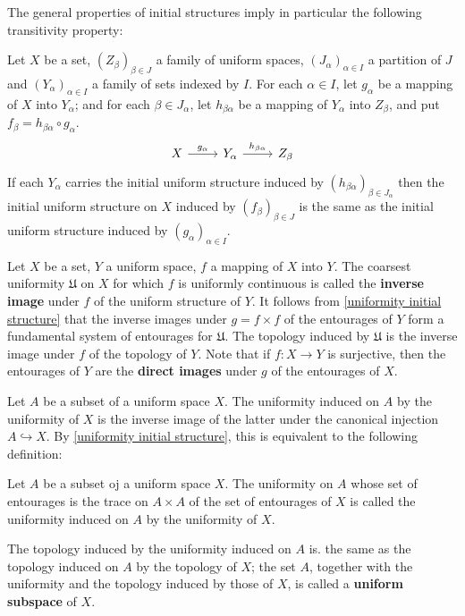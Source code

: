 The general properties of initial structures imply in particular the following transitivity property:
\begin{proposition}
Let $X$ be a set, $(Z_\beta)_{\beta\in J}$ a family of uniform spaces, $(J_\alpha)_{\alpha\in I}$ a partition of $J$ and $(Y_\alpha)_{\alpha\in I}$ a family of sets indexed by $I$. For each $\alpha\in I$, let $g_\alpha$ be a mapping of $X$ into $Y_\alpha$; and for each $\beta\in J_\alpha$, let $h_{\beta\alpha}$ be a mapping of $Y_\alpha$ into $Z_\beta$, and put $f_\beta=h_{\beta\alpha}\circ g_\alpha$. 
\[\begin{tikzcd}
X\ar[r,"g_\alpha"]&Y_\alpha\ar[r,"h_{\beta\alpha}"]&Z_\beta
\end{tikzcd}\]
If each $Y_\alpha$ carries the initial uniform structure induced by $(h_{\beta\alpha})_{\beta\in J_\alpha}$ then the initial uniform structure on $X$ induced by $(f_\beta)_{\beta\in J}$ is the same as the initial uniform structure induced by $(g_\alpha)_{\alpha\in I}$.
\end{proposition}
Let $X$ be a set, $Y$ a uniform space, $f$ a mapping of $X$ into $Y$. The coarsest uniformity $\mathfrak{U}$ on $X$ for which $f$ is uniformly continuous is called the \textbf{inverse image} under $f$ of the uniform structure of $Y$. It follows from \cref{uniformity initial structure} that the inverse images under $g=f\times f$ of the entourages of $Y$ form a fundamental system of entourages for $\mathfrak{U}$. The topology induced by $\mathfrak{U}$ is the inverse image under $f$ of the topology of $Y$. Note that if $f:X\to Y$ is surjective, then the entourages of $Y$ are the \textbf{direct images} under $g$ of the entourages of $X$.\par
Let $A$ be a subset of a uniform space $X$. The uniformity induced on $A$ by the uniformity of $X$ is the inverse image of the latter under the canonical injection $A\hookrightarrow X$. By \cref{uniformity initial structure}, this is equivalent to the following definition:
\begin{definition}
Let $A$ be a subset oj a uniform space $X$. The uniformity on $A$ whose set of entourages is the trace on $A\times A$ of the set of entourages of $X$ is called the uniformity induced on $A$ by the uniformity of $X$.
\end{definition}
The topology induced by the uniformity induced on $A$ is. the same as the topology induced on $A$ by the topology of $X$; the set $A$, together with the uniformity and the topology induced by those of $X$, is called a \textbf{uniform subspace} of $X$.\par
